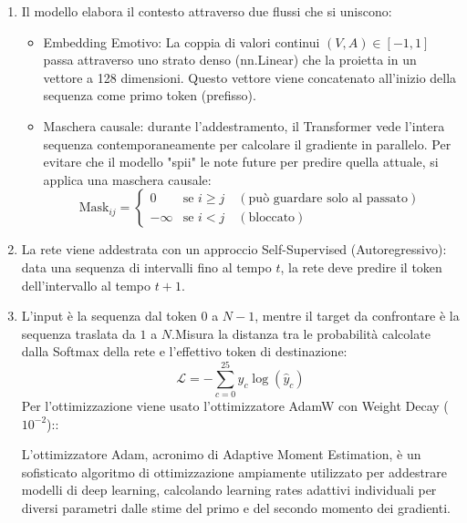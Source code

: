 \begin{enumerate}
    Nel 15\% dei casi di addestramento, i valori di Valenza e Arousal passati alla rete vengono impostati forzatamente a zero [0.0, 0.0].
    Si fa per Costringe il Transformer a imparare prima la struttura della sintassi musicale in modo indipendente ("incondizionato") e solo successivamente a correlarla alle emozioni, evitando che si affidi unicamente all'emozione ignorando la coerenza melodica, questa tecnica è nota come "Conditioning Dropout".
    \item Il modello elabora il contesto attraverso due flussi che si uniscono:
    \begin{itemize}
        \item     Embedding Emotivo: La coppia di valori continui $(V, A) \in [-1, 1]$ passa attraverso uno strato denso (nn.Linear) che la proietta in un vettore a 128 dimensioni. Questo vettore viene concatenato all'inizio della sequenza come primo token (prefisso).
        \item Maschera causale: durante l'addestramento, il Transformer vede l'intera sequenza contemporaneamente per calcolare il gradiente in parallelo. Per evitare che il modello "spii" le note future per predire quella attuale, si applica una maschera causale:
        \[\text{Mask}_{ij} = \begin{cases} 0 & \text{se } i \ge j \quad (\text{può guardare solo al passato}) \\ -\infty & \text{se } i < j \quad (\text{bloccato}) \end{cases}\]
    \end{itemize} 
    \item La rete viene addestrata con un approccio Self-Supervised (Autoregressivo): data una sequenza di intervalli fino al tempo $t$, la rete deve predire il token dell'intervallo al tempo $t+1$.
    \item L'input è la sequenza dal token $0$ a $N-1$, mentre il target da confrontare è la sequenza traslata da $1$ a $N$.Misura la distanza tra le probabilità calcolate dalla Softmax della rete e l'effettivo token di destinazione:$$\mathcal{L} = -\sum_{c=0}^{25} y_{c} \log(\hat{y}_{c})$$
     Per l'ottimizzazione viene usato l'ottimizzatore AdamW con Weight Decay ($10^{-2}$)::
     
     L'ottimizzatore Adam, acronimo di Adaptive Moment Estimation, è un sofisticato algoritmo di ottimizzazione ampiamente utilizzato per addestrare modelli di deep learning, calcolando learning rates adattivi individuali per diversi parametri dalle stime del primo e del secondo momento dei gradienti.


\end{enumerate}
